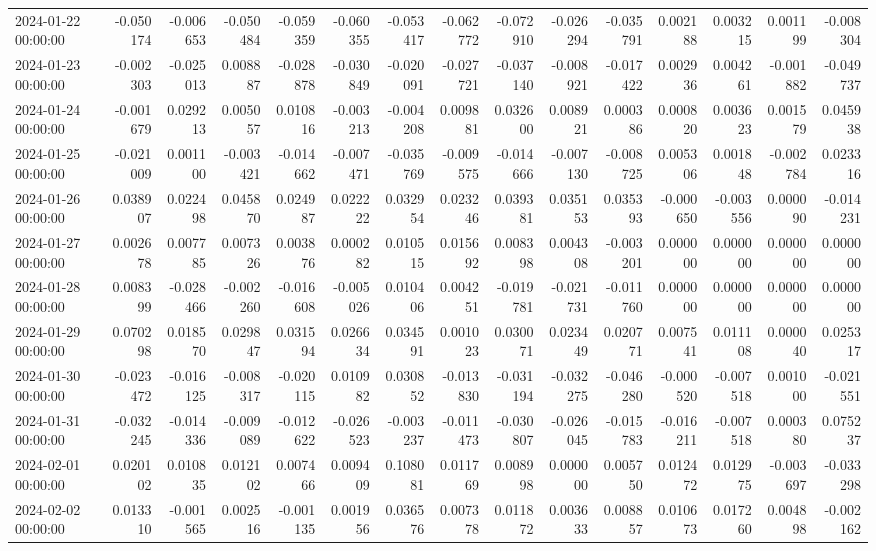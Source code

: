 \begin{tabular}{lrrrrrrrrrrrrrr}
2024-01-22 00:00:00 & -0.050174 & -0.006653 & -0.050484 & -0.059359 & -0.060355 & -0.053417 & -0.062772 & -0.072910 & -0.026294 & -0.035791 & 0.002188 & 0.003215 & 0.001199 & -0.008304 \\
2024-01-23 00:00:00 & -0.002303 & -0.025013 & 0.008887 & -0.028878 & -0.030849 & -0.020091 & -0.027721 & -0.037140 & -0.008921 & -0.017422 & 0.002936 & 0.004261 & -0.001882 & -0.049737 \\
2024-01-24 00:00:00 & -0.001679 & 0.029213 & 0.005057 & 0.010816 & -0.003213 & -0.004208 & 0.009881 & 0.032600 & 0.008921 & 0.000386 & 0.000820 & 0.003623 & 0.001579 & 0.045938 \\
2024-01-25 00:00:00 & -0.021009 & 0.001100 & -0.003421 & -0.014662 & -0.007471 & -0.035769 & -0.009575 & -0.014666 & -0.007130 & -0.008725 & 0.005306 & 0.001848 & -0.002784 & 0.023316 \\
2024-01-26 00:00:00 & 0.038907 & 0.022498 & 0.045870 & 0.024987 & 0.022222 & 0.032954 & 0.023246 & 0.039381 & 0.035153 & 0.035393 & -0.000650 & -0.003556 & 0.000090 & -0.014231 \\
2024-01-27 00:00:00 & 0.002678 & 0.007785 & 0.007326 & 0.003876 & 0.000282 & 0.010515 & 0.015692 & 0.008398 & 0.004308 & -0.003201 & 0.000000 & 0.000000 & 0.000000 & 0.000000 \\
2024-01-28 00:00:00 & 0.008399 & -0.028466 & -0.002260 & -0.016608 & -0.005026 & 0.010406 & 0.004251 & -0.019781 & -0.021731 & -0.011760 & 0.000000 & 0.000000 & 0.000000 & 0.000000 \\
2024-01-29 00:00:00 & 0.070298 & 0.018570 & 0.029847 & 0.031594 & 0.026634 & 0.034591 & 0.001023 & 0.030071 & 0.023449 & 0.020771 & 0.007541 & 0.011108 & 0.000040 & 0.025317 \\
2024-01-30 00:00:00 & -0.023472 & -0.016125 & -0.008317 & -0.020115 & 0.010982 & 0.030852 & -0.013830 & -0.031194 & -0.032275 & -0.046280 & -0.000520 & -0.007518 & 0.001000 & -0.021551 \\
2024-01-31 00:00:00 & -0.032245 & -0.014336 & -0.009089 & -0.012622 & -0.026523 & -0.003237 & -0.011473 & -0.030807 & -0.026045 & -0.015783 & -0.016211 & -0.007518 & 0.000380 & 0.075237 \\
2024-02-01 00:00:00 & 0.020102 & 0.010835 & 0.012102 & 0.007466 & 0.009409 & 0.108081 & 0.011769 & 0.008998 & 0.000000 & 0.005750 & 0.012472 & 0.012975 & -0.003697 & -0.033298 \\
2024-02-02 00:00:00 & 0.013310 & -0.001565 & 0.002516 & -0.001135 & 0.001956 & 0.036576 & 0.007378 & 0.011872 & 0.003633 & 0.008857 & 0.010673 & 0.017260 & 0.004898 & -0.002162 \\

\end{tabular}
